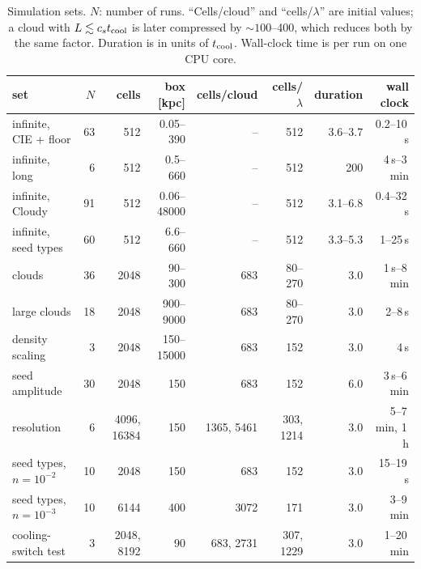 \documentclass[11pt]{article}
\newcommand{\tcool}{t_{\rm cool}}
\newcommand{\cstc}{c_s t_{\rm cool}}
\begin{document}
\begin{table}[H]
\centering
\small
\caption{Simulation sets. $N$: number of runs. ``Cells/cloud'' and ``cells/$\lambda$''
are initial values; a cloud with $L\lesssim\cstc$ is later compressed by
$\sim100$--400, which reduces both by the same factor. Duration is in units of
$\tcool$. Wall-clock time is per run on one CPU core.}
\label{tab:runs}
\begin{tabular}{lrrrrrrr}
\toprule
set & $N$ & cells & box [kpc] & cells/cloud & cells/$\lambda$ & duration & wall clock \\
\midrule
infinite, CIE + floor      & 63 & 512   & 0.05--390       & --        & 512       & 3.6--3.7 & 0.2--10\,s \\
infinite, long             & 6  & 512   & 0.5--660        & --        & 512       & 200      & 4\,s--3\,min \\
infinite, Cloudy           & 91 & 512   & 0.06--48000     & --        & 512       & 3.1--6.8 & 0.4--32\,s \\
infinite, seed types       & 60 & 512   & 6.6--660        & --        & 512       & 3.3--5.3 & 1--25\,s \\
clouds                     & 36 & 2048  & 90--300         & 683       & 80--270   & 3.0      & 1\,s--8\,min \\
large clouds               & 18 & 2048  & 900--9000       & 683       & 80--270   & 3.0      & 2--8\,s \\
density scaling            & 3  & 2048  & 150--15000      & 683       & 152       & 3.0      & 4\,s \\
seed amplitude             & 30 & 2048  & 150             & 683       & 152       & 6.0      & 3\,s--6\,min \\
resolution                 & 6  & 4096, 16384 & 150       & 1365, 5461 & 303, 1214 & 3.0     & 5--7\,min, 1\,h \\
seed types, $n=10^{-2}$    & 10 & 2048  & 150             & 683       & 152       & 3.0      & 15--19\,s \\
seed types, $n=10^{-3}$    & 10 & 6144  & 400             & 3072      & 171       & 3.0      & 3--9\,min \\
cooling-switch test        & 3  & 2048, 8192 & 90         & 683, 2731 & 307, 1229 & 3.0      & 1--20\,min \\
\bottomrule
\end{tabular}
\end{table}
\end{document}
